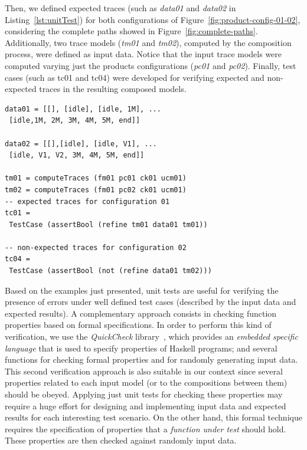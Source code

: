 \documentclass{acm_proc_article-sp}
\begin{document}
Then, we defined expected traces (such as \emph{data01} and 
\emph{data02} in Listing~\ref{lst:unitTest}) for both configurations 
of Figure~\ref{fig:product-config-01-02}, considering the complete paths 
showed in Figure~\ref{fig:complete-paths}. Additionally, two trace models
(\emph{tm01} and \emph{tm02}), computed by the composition process, were defined 
as input data. Notice that the input trace models were computed varying just the 
products configurations (\emph{pc01} and \emph{pc02}). 
Finally, test cases (such as tc01 and tc04) were developed 
for verifying expected and non-expected traces in the resulting composed models. 

\begin{lstlisting}[belowskip=10pt,frame=tb,caption={Unit test for composition process},label=lst:unitTest]
data01 = [[], [idle], [idle, 1M], ...
 [idle,1M, 2M, 3M, 4M, 5M, end]]

data02 = [[],[idle], [idle, V1], ...
 [idle, V1, V2, 3M, 4M, 5M, end]]

tm01 = computeTraces (fm01 pc01 ck01 ucm01)
tm02 = computeTraces (fm01 pc02 ck01 ucm01)
-- expected traces for configuration 01
tc01 = 
 TestCase (assertBool (refine tm01 data01 tm01))

-- non-expected traces for configuration 02
tc04 = 
 TestCase (assertBool (not (refine data01 tm02)))
\end{lstlisting}

Based on the examples just presented, unit tests are useful for 
verifying the presence of errors under well defined test cases 
(described by the input data and expected results). A complementary 
approach consists in checking function properties based on formal 
specifications. In order to perform this kind of verification, we use 
the \emph{QuickCheck} library~\cite{claessen00-icfp-2000}, which provides 
an \emph{embedded specific language} that is used to specify 
properties of Haskell programs; and several functions for checking 
formal properties and for randomly generating input data. 
This second verification approach is also suitable in our context since 
several properties related to each input model (or to the compositions between them) 
should be obeyed. Applying just unit tests for checking these properties may 
require a huge effort for designing and implementing input data and expected results 
for each interesting test scenario. On the other hand, this formal technique 
requires the specification of properties that a \emph{function under test} 
should hold. These properties are then checked against randomly input data. 
\end{document}
